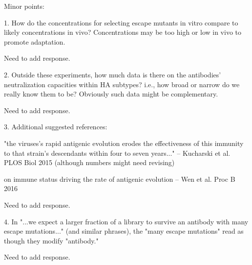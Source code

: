 \documentclass[11pt, oneside]{article}   	%
\begin{document}
Minor points:

1. How do the concentrations for selecting escape mutants in vitro compare to likely concentrations in vivo? Concentrations may be too high or low in vivo to promote adaptation.

{\color{red}
Need to add response.}

2. Outside these experiments, how much data is there on the antibodies' neutralization capacities within HA subtypes? i.e., how broad or narrow do we really know them to be? Obviously such data might be complementary. 

{\color{red}
Need to add response.}

3. Additional suggested references: 

"the viruses's rapid antigenic evolution erodes the effectiveness of this immunity to that strain's descendants within four to seven years..." -- Kucharski et al. PLOS Biol 2015 (although numbers might need revising)

on immune status driving the rate of antigenic evolution -- Wen et al. Proc B 2016

{\color{red}
Need to add response.}

4. In "...we expect a larger fraction of a library to survive an antibody with many escape mutations..." (and similar phrases), the "many escape mutations" read as though they modify "antibody."

{\color{red}
Need to add response.}
\end{document}
